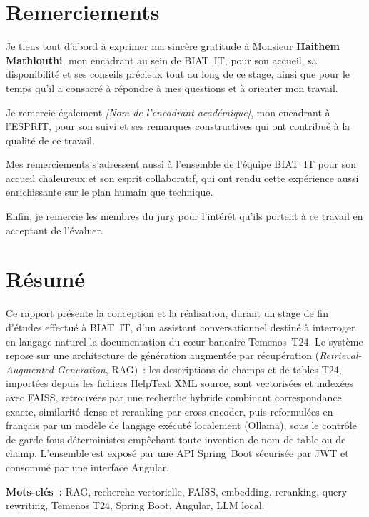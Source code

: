 ﻿\documentclass[12pt,a4paper]{report}
\newcommand{\ph}[1]{\textit{\color{mutedgray}[#1]}}
\begin{document}

\chapter*{Remerciements}

Je tiens tout d'abord à exprimer ma sincère gratitude à Monsieur \textbf{Haithem Mathlouthi}, mon encadrant au sein de BIAT~IT, pour son accueil, sa disponibilité et ses conseils précieux tout au long de ce stage, ainsi que pour le temps qu'il a consacré à répondre à mes questions et à orienter mon travail.

Je remercie également \ph{Nom de l'encadrant académique}, mon encadrant à l'ESPRIT, pour son suivi et ses remarques constructives qui ont contribué à la qualité de ce travail.

Mes remerciements s'adressent aussi à l'ensemble de l'équipe BIAT~IT pour son accueil chaleureux et son esprit collaboratif, qui ont rendu cette expérience aussi enrichissante sur le plan humain que technique.

Enfin, je remercie les membres du jury pour l'intérêt qu'ils portent à ce travail en acceptant de l'évaluer.

\chapter*{Résumé}
Ce rapport présente la conception et la réalisation, durant un stage de fin d'études effectué à BIAT~IT, d'un assistant conversationnel destiné à interroger en langage naturel la documentation du cœur bancaire Temenos~T24. Le système repose sur une architecture de génération augmentée par récupération (\emph{Retrieval-Augmented Generation}, RAG)~: les descriptions de champs et de tables T24, importées depuis les fichiers HelpText XML source, sont vectorisées et indexées avec FAISS, retrouvées par une recherche hybride combinant correspondance exacte, similarité dense et reranking par cross-encoder, puis reformulées en français par un modèle de langage exécuté localement (Ollama), sous le contrôle de garde-fous déterministes empêchant toute invention de nom de table ou de champ. L'ensemble est exposé par une API Spring~Boot sécurisée par JWT et consommé par une interface Angular.

\vspace{1em}
\noindent\textbf{Mots-clés~:} RAG, recherche vectorielle, FAISS, embedding, reranking, query rewriting, Temenos T24, Spring Boot, Angular, LLM local.
\end{document}
